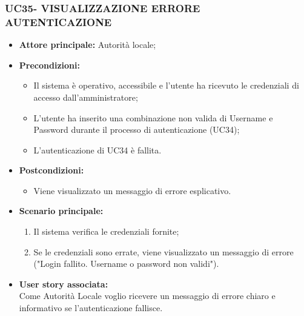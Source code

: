 \subsubsection{UC35- VISUALIZZAZIONE ERRORE AUTENTICAZIONE}
\begin{itemize}
    \item \textbf{Attore principale:} Autorità locale;
    \item \textbf{Precondizioni:}
        \begin{itemize}
            \item Il sistema è operativo, accessibile e l’utente ha ricevuto le credenziali di accesso dall'amministratore;
            \item L'utente ha inserito una combinazione non valida di Username e Password durante il processo di autenticazione (UC34);
            \item L'autenticazione di UC34 è fallita.
        \end{itemize}
    \item \textbf{Postcondizioni:}
        \begin{itemize}
            \item Viene visualizzato un messaggio di errore esplicativo.
        \end{itemize}
    \item \textbf{Scenario principale:}
        \begin{enumerate}
            \item Il sistema verifica le credenziali fornite;
            \item Se le credenziali sono errate, viene visualizzato un messaggio di errore ("Login fallito. Username o password non validi").
        \end{enumerate}
    \item \textbf{User story associata:} \\
    Come Autorità Locale voglio ricevere un messaggio di errore chiaro e informativo se l’autenticazione fallisce.
\end{itemize}